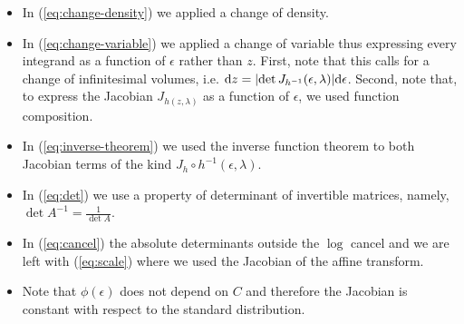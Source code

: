 \documentclass[11pt]{article}
\begin{document}
\begin{itemize}
	\item In (\ref{eq:change-density}) we applied a change of density. 
	\item In (\ref{eq:change-variable}) we applied a change of variable thus expressing every integrand as a function of $\epsilon$ rather than $z$. First, note that this calls for a change of infinitesimal volumes, i.e. $\dd z = \abs{\det J_{h^{-1}}(\epsilon, \lambda)} \dd \epsilon$. Second, note that, to express the Jacobian $J_{h(z, \lambda)}$ as a function of $\epsilon$, we used function composition.
	\item In (\ref{eq:inverse-theorem}) we used the inverse function theorem to both Jacobian terms of the kind $J_{h} \circ h^{-1}(\epsilon, \lambda)$.
	\item In (\ref{eq:det}) we use a property of determinant of invertible matrices, namely, $\det A^{-1} = \frac{1}{\det A}$.	
	\item In (\ref{eq:cancel}) the absolute determinants outside the $\log$ cancel and we are left with (\ref{eq:scale}) where we used the Jacobian of the affine transform.
	\item Note that $\phi(\epsilon)$ does not depend on $C$ and therefore the Jacobian is constant with respect to the standard distribution. 
\end{itemize}






\end{document}
